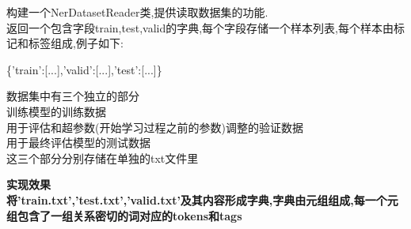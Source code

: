 \documentclass[11pt]{article}
\begin{document}
    构建一个NerDatasetReader类,提供读取数据集的功能.\\
返回一个包含字段train,test,valid的字典,每个字段存储一个样本列表,每个样本由标记和标签组成,例子如下:

    \{'train':{[}...{]},'valid':{[}...{]},'test':{[}...{]}\}

    数据集中有三个独立的部分\\
训练模型的训练数据\\
用于评估和超参数(开始学习过程之前的参数)调整的验证数据\\
用于最终评估模型的测试数据\\
这三个部分分别存储在单独的txt文件里

    \textbf{实现效果}\\
\textbf{将'train.txt','test.txt','valid.txt'及其内容形成字典,字典由元组组成,每一个元组包含了一组关系密切的词对应的tokens和tags}
\end{document}

